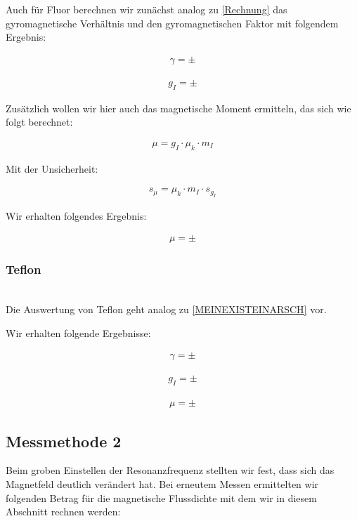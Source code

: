 \documentclass[12pt]{article}
\begin{document}
Auch für Fluor berechnen wir zunächst analog zu \ref{Rechnung} das gyromagnetische Verhältnis und den gyromagnetischen Faktor mit folgendem Ergebnis:

\begin{align*}
\gamma =  \pm
\end{align*}

\begin{align*}
g_I =   \pm
\end{align*}

Zusätzlich wollen wir hier auch das magnetische Moment ermitteln, das sich wie folgt berechnet:

\begin{align*}
\mu = g_I \cdot \mu_k \cdot m_I
\end{align*}

Mit der Unsicherheit:

\begin{align*}
s_\mu = \mu_k \cdot m_I \cdot s_{g_I}
\end{align*}

Wir erhalten folgendes Ergebnis:

\begin{align*}
\mu =  \pm
\end{align*}
\subsubsection{Teflon}
\ \\
Die Auswertung von Teflon geht analog zu \ref{MEINEXISTEINARSCH} vor.

Wir erhalten folgende Ergebnisse:

\begin{align*}
\gamma =  \pm
\end{align*}

\begin{align*}
g_I =   \pm
\end{align*}

\begin{align*}
\mu =  \pm
\end{align*}
\newpage

\subsection{Messmethode 2}
Beim groben Einstellen der Resonanzfrequenz stellten wir fest, dass sich das Magnetfeld deutlich verändert hat. Bei erneutem Messen ermittelten wir folgenden Betrag für die magnetische Flussdichte mit dem wir in diesem Abschnitt rechnen werden:
\end{document}
